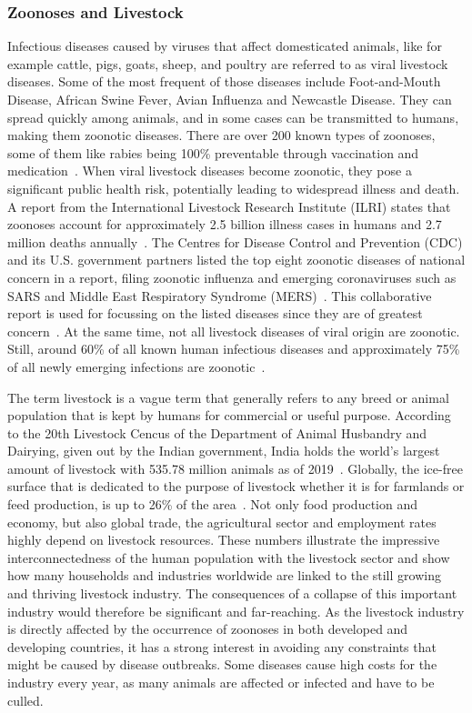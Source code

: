 \subsubsection*{Zoonoses and Livestock}
Infectious diseases caused by viruses that affect domesticated animals, like for example cattle, pigs, goats, sheep, and poultry are referred to as viral livestock diseases. Some of the most frequent of those diseases include Foot-and-Mouth Disease, African Swine Fever, Avian Influenza and Newcastle Disease. They can spread quickly among animals, and in some cases can be transmitted to humans, making them zoonotic diseases. There are over 200 known types of zoonoses, some of them like rabies being 100\% preventable through vaccination and medication~\cite{who2020zoon}. When viral livestock diseases become zoonotic, they pose a significant public health risk, potentially leading to widespread illness and death. A report from the International Livestock Research Institute (ILRI) states that zoonoses account for approximately 2.5 billion illness cases in humans and 2.7 million deaths annually~\cite{grace2012mapping}. The Centres for Disease Control and Prevention (CDC) and its U.S. government partners listed the top eight zoonotic diseases of national concern in a report, filing zoonotic influenza and emerging coronaviruses such as SARS and Middle East Respiratory Syndrome (MERS)~\cite{brown2006recent}. This collaborative report is used for focussing on the listed diseases since they are of greatest concern~\cite{centers8zoonotic}. At the same time, not all livestock diseases of viral origin are zoonotic. Still, around 60\% of all known human infectious diseases and approximately 75\% of all newly emerging infections are zoonotic~\cite{jones2008global}.

The term livestock is a vague term that generally refers to any breed or animal population that is kept by humans for commercial or useful purpose. According to the 20th Livestock Cencus of the Department of Animal Husbandry and Dairying, given out by the Indian government, India holds the world's largest amount of livestock with 535.78 million animals as of 2019~\cite{livestock2019}. Globally, the ice-free surface that is dedicated to the purpose of livestock whether it is for farmlands or feed production, is up to 26\% of the area~\cite{steinfeld2006livestock}. Not only food production and economy, but also global trade, the agricultural sector and employment rates highly depend on livestock resources. These numbers illustrate the impressive interconnectedness of the human population with the livestock sector and show how many households and industries worldwide are linked to the still growing and thriving livestock industry. The consequences of a collapse of this important industry would therefore be significant and far-reaching. As the livestock industry is directly affected by the occurrence of zoonoses in both developed and developing countries, it has a strong interest in avoiding any constraints that might be caused by disease outbreaks. Some diseases cause high costs for the industry every year, as many animals are affected or infected and have to be culled.

